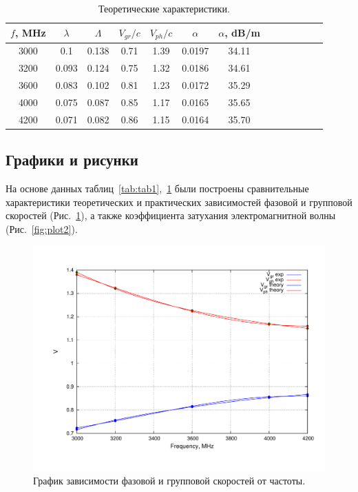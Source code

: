 \documentclass[11pt,a4paper,oneside, reqno]{amsproc}
\begin{document}
\begin{centering}
\begin{table}[h!]
\vspace{10pt}
\begin{tabular}{ccccccccccccc} \toprule %
\newcolumntype{W}{D{.}{.}{2.3}}
$f$, MHz  &  $\lambda$  &  $\Lambda$  &  $V_{gr}/c$  &  $V_{ph}/c$  &  $\alpha$  &  $\alpha$, dB/m  \\
 \midrule
3000  &  0.1    &  0.138  &  0.71  &  1.39  &  0.0197  &  34.11  \\
3200  &  0.093  &  0.124  &  0.75  &  1.32  &  0.0186  &  34.61  \\
3600  &  0.083  &  0.102  &  0.81  &  1.23  &  0.0172  &  35.29  \\
4000  &  0.075  &  0.087  &  0.85  &  1.17  &  0.0165  &  35.65  \\
4200  &  0.071  &  0.082  &  0.86  &  1.15  &  0.0164  &  35.70  \\
\bottomrule
\end{tabular}
\vspace{5 pt}
\caption{Теоретические характеристики.} 
\label{tab:tab2}
\end{table}
\end{centering}

\subsection{Графики и рисунки}
На основе данных таблиц~\ref{tab:tab1},~\ref{tab:tab2} были построены сравнительные характеристики
теоретических и практических зависимостей фазовой и групповой скоростей (Рис.~\ref{fig:plot1}), а также коэффициента
затухания электромагнитной волны (Рис.~\ref{fig:plot2}).

\begin{figure}[h!]
    \begin{center}
        \includegraphics[width=\textwidth]{plot1.pdf}
    \end{center}
    \caption{График зависимости фазовой и групповой скоростей от частоты.}
    \label{fig:plot1}
\end{figure}
\end{document}
